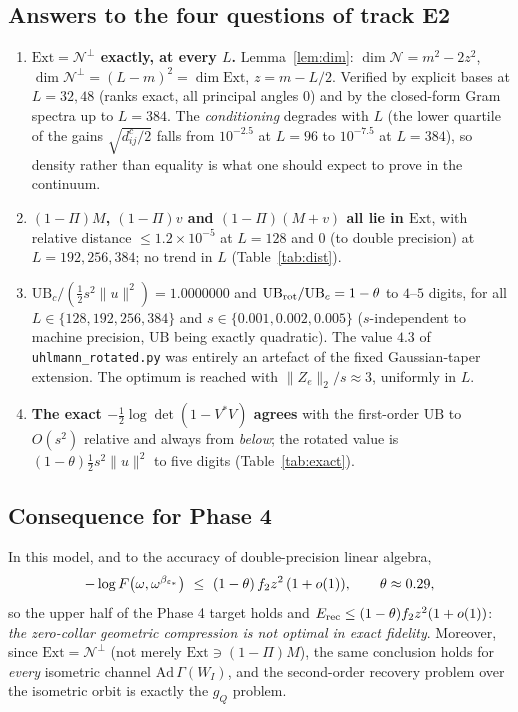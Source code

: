 \documentclass[11pt]{article}
\begin{document}
\subsection{Answers to the four questions of track E2}
\begin{enumerate}[leftmargin=1.8em,itemsep=3pt]
\item[(a)] \textbf{$\mathrm{Ext}=\mathcal N^\perp$ exactly, at every $L$.}  Lemma~\ref{lem:dim}:
 $\dim\mathcal N=m^2-2z^2$, $\dim\mathcal N^\perp=(L-m)^2=\dim\mathrm{Ext}$, $z=m-L/2$.
 Verified by explicit bases at $L=32,48$ (ranks exact, all principal angles $0$) and by the
 closed-form Gram spectra up to $L=384$.  The \emph{conditioning} degrades with $L$ (the
 lower quartile of the gains $\sqrt{d^c_{ij}/2}$ falls from $10^{-2.5}$ at $L=96$ to
 $10^{-7.5}$ at $L=384$), so density rather than equality is what one should expect to
 prove in the continuum.
\item[(b)] \textbf{$(1-\Pi)M$, $(1-\Pi)v$ and $(1-\Pi)(M+v)$ all lie in $\mathrm{Ext}$}, with
 relative distance $\le1.2\times10^{-5}$ at $L=128$ and $0$ (to double precision) at
 $L=192,256,384$; no trend in $L$ (Table~\ref{tab:dist}).
\item[(c)] \textbf{$\mathrm{UB}_c/(\tfrac12 s^2\|u\|^2)=1.0000000$} and
 \textbf{$\mathrm{UB}_{\rm rot}/\mathrm{UB}_c=1-\theta$} to $4$--$5$ digits, for all
 $L\in\{128,192,256,384\}$ and $s\in\{0.001,0.002,0.005\}$ ($s$-independent to machine
 precision, $\mathrm{UB}$ being exactly quadratic).  The value $4.3$ of
 \texttt{uhlmann\_rotated.py} was entirely an artefact of the fixed Gaussian-taper
 extension.  The optimum is reached with $\|Z_e\|_2/s\approx3$, uniformly in $L$.
\item[(d)] \textbf{The exact $-\frac12\log\det(1-V^*V)$ agrees} with the first-order
 $\mathrm{UB}$ to $O(s^2)$ relative and always from \emph{below}; the rotated value is
 $(1-\theta)\tfrac12 s^2\|u\|^2$ to five digits (Table~\ref{tab:exact}).
\end{enumerate}

\subsection{Consequence for Phase 4}
In this model, and to the accuracy of double-precision linear algebra,
\begin{equation}
 -\log F\bigl(\omega,\omega^{\beta_{\eps_*}}\bigr)\ \le\ (1-\theta)\,f_2z^2\,(1+o(1)),
 \qquad \theta\approx0.29,
\end{equation}
so the upper half of the Phase 4 target holds and $E_{\rm rec}\le(1-\theta)f_2z^2(1+o(1))$:
\emph{the zero-collar geometric compression is not optimal in exact fidelity}.  Moreover,
since $\mathrm{Ext}=\mathcal N^\perp$ (not merely $\mathrm{Ext}\ni(1-\Pi)M$), the same
conclusion holds for \emph{every} isometric channel $\mathrm{Ad}\,\Gamma(W_I)$, and the
second-order recovery problem over the isometric orbit is exactly the $g_Q$ problem.
\end{document}
